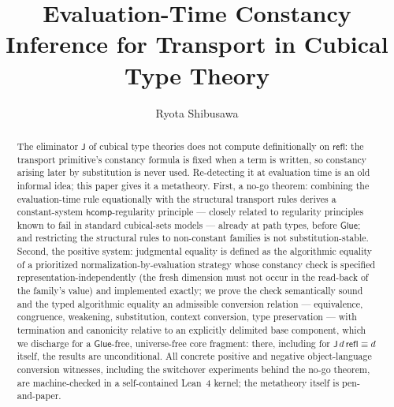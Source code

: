 \documentclass{lmcs}
\newcommand{\hcomp}{\mathsf{hcomp}}
\newcommand{\refl}{\mathsf{refl}}
\newcommand{\J}{\mathsf{J}}
\newcommand{\Glue}{\mathsf{Glue}}
\renewcommand{\conv}{\equiv}
\begin{document}
\title[Evaluation-Time Constancy Inference]{Evaluation-Time Constancy
  Inference for Transport in Cubical Type Theory}

\author[R.~Shibusawa]{Ryota Shibusawa}
\address{Daiichi Institute of Technology, Japan}



\begin{abstract}
  The eliminator $\J$ of cubical type theories does not compute
  definitionally on $\refl$: the transport primitive's constancy
  formula is fixed when a term is written, so constancy arising later
  by substitution is never used.  Re-detecting it at evaluation time
  is an old informal idea; this paper gives it a metatheory.  First,
  a no-go theorem: combining the evaluation-time rule equationally
  with the structural transport rules derives a constant-system
  $\hcomp$-regularity principle --- closely related to regularity
  principles known to fail in standard cubical-sets models ---
  already at path types, before $\Glue$; and restricting the
  structural rules to non-constant families is not
  substitution-stable.  Second, the positive system: judgmental
  equality is defined as the algorithmic equality of a prioritized
  normalization-by-evaluation strategy whose constancy check is
  specified representation-independently (the fresh dimension must
  not occur in the read-back of the family's value) and implemented
  exactly; we prove the check semantically sound and the typed
  algorithmic equality an admissible conversion relation ---
  equivalence, congruence, weakening, substitution, context
  conversion, type preservation --- with termination and canonicity
  relative to an explicitly delimited base component, which we
  discharge for a $\Glue$-free, universe-free core fragment: there,
  including for $\J\,d\,\refl \conv d$ itself, the results are
  unconditional.  All concrete positive and negative
  object-language conversion witnesses, including the switchover
  experiments behind the no-go theorem, are machine-checked in a
  self-contained Lean~4 kernel; the metatheory itself is
  pen-and-paper.
\end{abstract}

\maketitle
\end{document}
